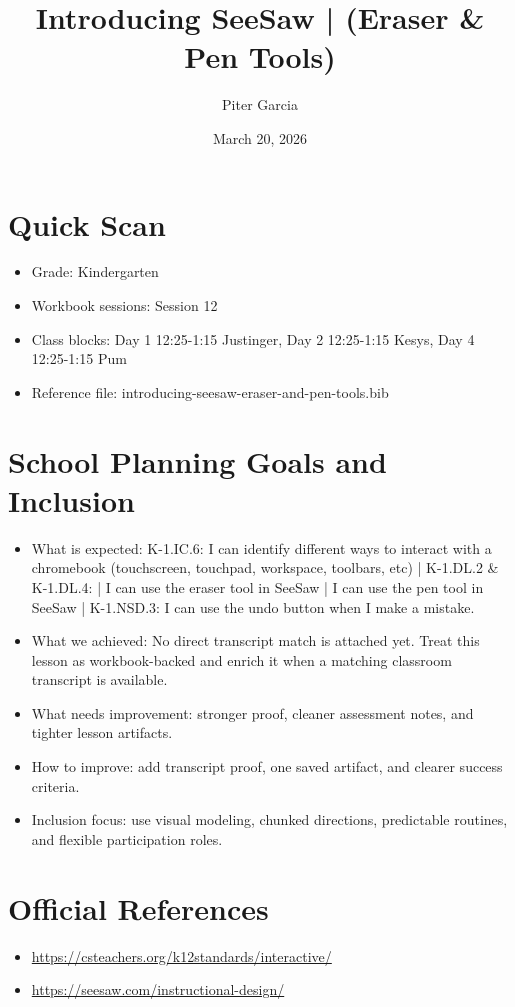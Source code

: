 \documentclass[11pt]{article}
\title{Introducing SeeSaw | (Eraser & Pen Tools)}
\author{Piter Garcia}
\date{March 20, 2026}
\begin{document}
    \maketitle
    \section*{Quick Scan}
    \begin{itemize}[leftmargin=*]
    \item Grade: Kindergarten
    \item Workbook sessions: Session 12
    \item Class blocks: Day 1 12:25-1:15 Justinger, Day 2 12:25-1:15 Kesys, Day 4 12:25-1:15 Pum
    \item Reference file: introducing-seesaw-eraser-and-pen-tools.bib
    \end{itemize}
    \section*{School Planning Goals and Inclusion}
    \begin{itemize}[leftmargin=*]
    \item What is expected: K-1.IC.6: I can identify different ways to interact with a chromebook (touchscreen, touchpad, workspace, toolbars, etc) | K-1.DL.2 & K-1.DL.4: | I can use the eraser tool in SeeSaw | I can use the pen tool in SeeSaw | K-1.NSD.3: I can use the undo button when I make a mistake.
    \item What we achieved: No direct transcript match is attached yet. Treat this lesson as workbook-backed and enrich it when a matching classroom transcript is available.
    \item What needs improvement: stronger proof, cleaner assessment notes, and tighter lesson artifacts.
    \item How to improve: add transcript proof, one saved artifact, and clearer success criteria.
    \item Inclusion focus: use visual modeling, chunked directions, predictable routines, and flexible participation roles.
    \end{itemize}
    \section*{Official References}
    \begin{itemize}[leftmargin=*]
    \item \url{https://csteachers.org/k12standards/interactive/}
\item \url{https://seesaw.com/instructional-design/}

    \end{itemize}
    
\end{document}
